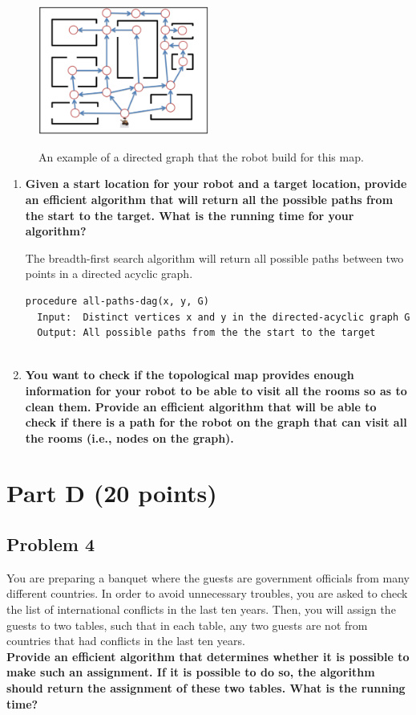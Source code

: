 \documentclass[11pt]{article}
\begin{document}
\begin{figure}[h]
  \centering
  \caption{An example of a directed graph that the robot build for this map.}
    \includegraphics[width=0.5\textwidth]{paths}
    \label{fig:problem3}
\end{figure}

\begin{enumerate}[label=\Alph*.]

\item \textbf{Given a start location for your robot and a target
location, provide an efficient algorithm that will return all the
possible paths from the start to the target.  What is the running time
for your algorithm?}

The breadth-first search algorithm will return all possible paths
between two points in a directed acyclic graph.

\begin{verbatim}
procedure all-paths-dag(x, y, G)
  Input:  Distinct vertices x and y in the directed-acyclic graph G
  Output: All possible paths from the the start to the target
  
\end{verbatim}

\item \textbf{You want to check if the topological map provides
enough information for your robot to be able to visit all the rooms so
as to clean them. Provide an efficient algorithm that will be able to
check if there is a path for the robot on the graph that can visit all
the rooms (i.e., nodes on the graph).}
\end{enumerate}

\section*{Part D (20 points)}

\subsection*{Problem 4} You are preparing a banquet where the
guests are government officials from many different countries. In
order to avoid unnecessary troubles, you are asked to check the list
of international conflicts in the last ten years. Then, you will
assign the guests to two tables, such that in each table, any two
guests are not from countries that had conflicts in the last ten
years.\\

\noindent \textbf{Provide an efficient algorithm that determines whether it is
possible to make such an assignment. If it is possible to do so, the
algorithm should return the assignment of these two tables. What is
the running time?}
\end{document}
